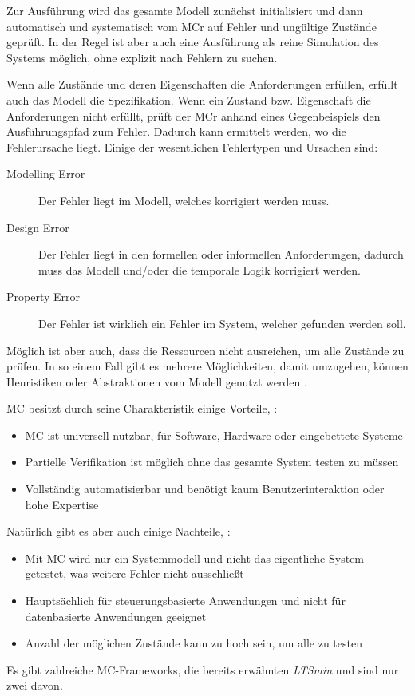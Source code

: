 Zur Ausführung wird das gesamte Modell zunächst initialisiert und dann automatisch und systematisch vom \ac{MCr} auf Fehler und ungültige Zustände geprüft. In der Regel ist aber auch eine Ausführung als reine Simulation des Systems möglich, ohne explizit nach Fehlern zu suchen.

Wenn alle Zustände und deren Eigenschaften die Anforderungen erfüllen, erfüllt auch das Modell die Spezifikation. Wenn ein Zustand bzw. Eigenschaft die Anforderungen nicht erfüllt, prüft der \ac{MCr} anhand eines Gegenbeispiels den Ausführungspfad zum Fehler. Dadurch kann ermittelt werden, wo die Fehlerursache liegt. Einige der wesentlichen Fehlertypen und Ursachen sind:

\begin{description}
	\item[Modelling Error] Der Fehler liegt im Modell, welches korrigiert werden muss.
	\item[Design Error] Der Fehler liegt in den formellen oder informellen Anforderungen, dadurch muss das Modell und/oder die temporale Logik korrigiert werden.
	\item[Property Error] Der Fehler ist wirklich ein Fehler im System, welcher gefunden werden soll.
\end{description}

Möglich ist aber auch, dass die Ressourcen nicht ausreichen, um alle Zustände zu prüfen. In so einem Fall gibt es mehrere Möglichkeiten, damit umzugehen, \zB können Heuristiken oder Abstraktionen vom Modell genutzt werden \cite{Baier2008,Eberhardinger2016}.

\ac{MC} besitzt durch seine Charakteristik einige Vorteile, \uA \cite{Baier2008}:
\begin{itemize}
	\item \ac{MC} ist universell nutzbar, \zB für Software, Hardware oder eingebettete Systeme
	\item Partielle Verifikation ist möglich ohne das gesamte System testen zu müssen
	\item Vollständig automatisierbar und benötigt kaum Benutzerinteraktion oder hohe Expertise
\end{itemize}

Natürlich gibt es aber auch einige Nachteile, \uA \cite{Baier2008}:
\begin{itemize}
	\item Mit \ac{MC} wird nur ein Systemmodell und nicht das eigentliche System getestet, was weitere Fehler nicht ausschließt
	\item Hauptsächlich für steuerungsbasierte Anwendungen und nicht für datenbasierte Anwendungen geeignet
	\item Anzahl der möglichen Zustände kann zu hoch sein, um alle zu testen
\end{itemize}

Es gibt zahlreiche \ac{MC}-Frameworks, die bereits erwähnten \emph{LTSmin} und \emph{\sS} sind nur zwei davon.